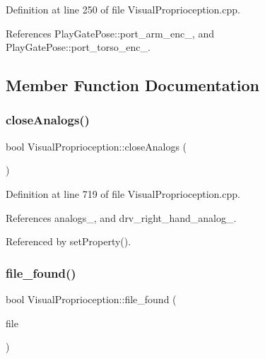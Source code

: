 Definition at line 250 of file Visual\+Proprioception.\+cpp.



References Play\+Gate\+Pose\+::port\+\_\+arm\+\_\+enc\+\_\+, and Play\+Gate\+Pose\+::port\+\_\+torso\+\_\+enc\+\_\+.



\subsection{Member Function Documentation}
\mbox{\label{classVisualProprioception_a0d7954358702576e252efd76694d9a18}} 
\subsubsection{\texorpdfstring{close\+Analogs()}{closeAnalogs()}}
{\footnotesize\ttfamily bool Visual\+Proprioception\+::close\+Analogs (\begin{DoxyParamCaption}{ }\end{DoxyParamCaption})\hspace{0.3cm}{\ttfamily [protected]}}



Definition at line 719 of file Visual\+Proprioception.\+cpp.



References analogs\+\_\+, and drv\+\_\+right\+\_\+hand\+\_\+analog\+\_\+.



Referenced by set\+Property().

\mbox{\label{classVisualProprioception_ab7be48b8a9dae0913d7554c3e30ad9e4}} 
\subsubsection{\texorpdfstring{file\+\_\+found()}{file\_found()}}
{\footnotesize\ttfamily bool Visual\+Proprioception\+::file\+\_\+found (\begin{DoxyParamCaption}\item[{const yarp\+::os\+::\+Const\+String \&}]{file }\end{DoxyParamCaption})\hspace{0.3cm}{\ttfamily [protected]}}



